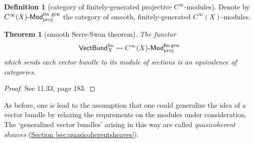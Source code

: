 \documentclass[a4paper]{report}
\def\mhyp{{\hbox{-}}}
\theoremstyle{definition}
\newtheorem{definition}{Definition}[section]
\theoremstyle{plain}
\newtheorem{theorem}{Theorem}[section]
\theoremstyle{remark}
\begin{document}
\begin{definition}[category of finitely-generated projective $C^{\infty}$-modules]
  \label{def:categoryofyaddayaddasmoothmodules}
  Denote by $C^{\infty}(X)\mhyp\mathsf{Mod}_{\mathrm{proj}}^{\mathrm{fin\ gen}}$ the category of smooth, finitely-generated $C^{\infty}(X)$-modules.
\end{definition}

\begin{theorem}[smooth Serre-Swan theorem]
  The functor 
  \begin{equation*}
    \mathsf{VectBund}^{\mathrm{fin}}_{X} \rightsquigarrow C^{\infty}(X)\mhyp\mathsf{Mod}^{\mathrm{fin\,gen}}_{\mathrm{proj}}
  \end{equation*}
  which sends each vector bundle to its module of sections is an equivalence of categories.
\end{theorem}
\begin{proof}
  See \cite{nestruev-smooth-manifolds-observables} 11.33, page 183.
\end{proof}

As before, one is lead to the assumption that one could generalize the idea of a vector bundle by relaxing the requrements on the modules under consideration. The `generalized vector bundles' arising in this way are called \emph{quasicoherent sheaves} (\hyperref[sec:quasicoherentsheaves]{Section \ref*{sec:quasicoherentsheaves}}).
\end{document}
